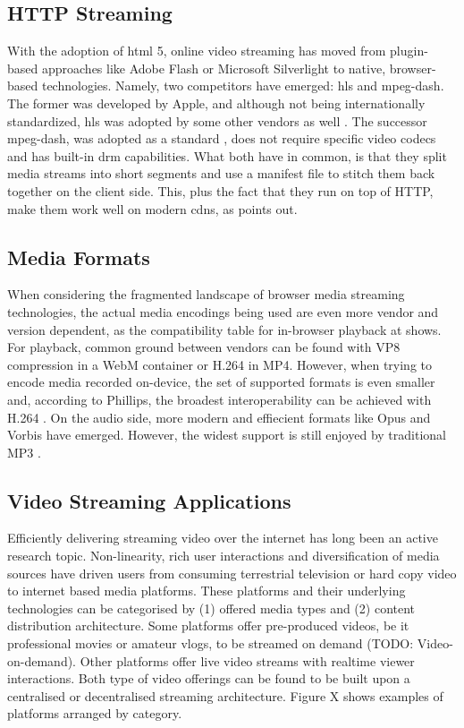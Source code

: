 \subsection{HTTP Streaming}
\label{subsec:http-streaming}

With the adoption of \gls{html} 5, online video streaming has moved from plugin-based approaches like Adobe Flash \cite{adobe-flash} or Microsoft Silverlight \cite{microsoft-silverlight} to native, browser-based technologies. Namely, two competitors have emerged: \gls{hls} and \gls{mpeg-dash}. The former was developed by Apple, and although not being internationally standardized, \gls{hls} was adopted by some other vendors as well \cite{caniuse-hls}. The successor \gls{mpeg-dash}, was adopted as a standard \cite{iso-mpeg-dash}, does not require specific video codecs and has built-in \gls{drm} capabilities. What both have in common, is that they split media streams into short segments and use a manifest file to stitch them back together on the client side. This, plus the fact that they run on top of HTTP, make them work well on modern \glspl{cdn}, as \cite{hls-vs-dash} points out.

\subsection{Media Formats}

When considering the fragmented landscape of browser media streaming technologies, the actual media encodings being used are even more vendor and version dependent, as the compatibility table for in-browser playback at \cite{media-format-browser-compat} shows. For playback, common ground between vendors can be found with VP8 compression in a WebM container or H.264 in MP4. However, when trying to encode media recorded on-device, the set of supported formats is even smaller and, according to Phillips, the broadest interoperability can be achieved with H.264 \cite[\S5.1]{webrtc-hacks-safari}. On the audio side, more modern and effiecient formats like Opus and Vorbis have emerged. However, the widest support is still enjoyed by traditional MP3 \cite{media-format-browser-compat}.

\subsection{Video Streaming Applications}

Efficiently delivering streaming video over the internet has long been an active research topic. Non-linearity, rich user interactions and diversification of media sources have driven users from consuming terrestrial television or hard copy video to internet based media platforms.
These platforms and their underlying technologies can be categorised by (1) offered media types and (2) content distribution architecture. Some platforms offer pre-produced videos, be it professional movies or amateur vlogs, to be streamed on demand (TODO: Video-on-demand). Other platforms offer live video streams with realtime viewer interactions.
Both type of video offerings can be found to be built upon a centralised or decentralised streaming architecture. Figure X shows examples of platforms arranged by category.


